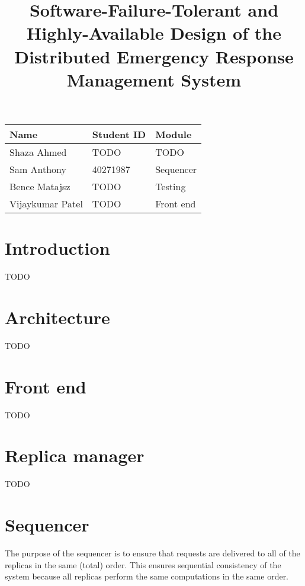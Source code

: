 \documentclass{article}
\title{Software-Failure-Tolerant and Highly-Available Design of the Distributed Emergency Response Management System}
\author{}
\begin{document}
\maketitle

\begin{center}
\begin{tabular}{l l l}
	\textbf{Name} & \textbf{Student ID} & \textbf{Module} \\ \hline\hline
	Shaza Ahmed & TODO & TODO \\ \hline
	Sam Anthony & 40271987 & Sequencer \\ \hline
	Bence Matajsz & TODO & Testing \\ \hline
	Vijaykumar Patel & TODO & Front end \\ \hline
\end{tabular}
\end{center}

\tableofcontents

\newpage


\section{Introduction}

TODO


\section{Architecture}

TODO

\section{Front end}

TODO


\section{Replica manager}

TODO


\section{Sequencer}

The purpose of the sequencer is to ensure that requests are delivered to all of the replicas in the same (total) order.
This ensures sequential consistency of the system because all replicas perform the same computations in the same order.
\end{document}
